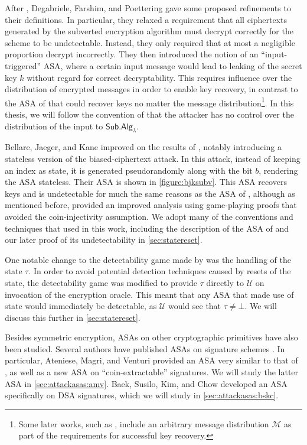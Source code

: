 After \cite{C:BelPatRog14}, Degabriele, Farshim, and Poettering \cite{FSE:DegFarPoe15} gave some proposed refinements to their definitions. In particular, they relaxed a requirement that all ciphertexts generated by the subverted encryption algorithm must decrypt correctly for the scheme to be undetectable. Instead, they only required that at most a negligible proportion decrypt incorrectly. They then introduced the notion of an ``input-triggered'' ASA, where a certain input message would lead to leaking of the secret key $k$ without regard for correct decryptability. This requires influence over the distribution of encrypted messages in order to enable key recovery, in contrast to the ASA of \cite{C:BelPatRog14} that could recover keys no matter the message distribution\footnote{Some later works, such as \cite{CCS:BelJaeKan15}, include an arbitrary message distribution $\mathcal{M}$ as part of the requirements for successful key recovery.}. In this thesis, we will follow the convention of \cite{C:BelPatRog14} that the attacker has no control over the distribution of the input to $\mathsf{Sub.Alg}_\lambda$.

Bellare, Jaeger, and Kane \cite{CCS:BelJaeKan15} improved on the results of \cite{C:BelPatRog14}, notably introducing a stateless version of the biased-ciphertext attack. In this attack, instead of keeping an index as state, it is generated pseudorandomly along with the bit $b$, rendering the ASA stateless. Their ASA is shown in \autoref{figure:bjksubv}. This ASA recovers keys and is undetectable for much the same reasons as the ASA of \cite{C:BelPatRog14}, although as mentioned before, \cite{CCS:BelJaeKan15} provided an improved analysis using game-playing proofs that avoided the coin-injectivity assumption. We adopt many of the conventions and techniques that \cite{CCS:BelJaeKan15} used in this work, including the description of the ASA of \cite{C:BelPatRog14} and our later proof of its undetectability in \autoref{sec:statereset}.

One notable change to the detectability game made by \cite{CCS:BelJaeKan15} was the handling of the state $\tau$. In order to avoid potential detection techniques caused by resets of the state, the detectability game was modified to provide $\tau$ directly to $\mathcal{U}$ on invocation of the encryption oracle. This meant that any ASA that made use of state would immediately be detectable, as $\mathcal{U}$ would see that $\tau \neq \bot$. We will discuss this further in \autoref{sec:statereset}.

Besides symmetric encryption, ASAs on other cryptographic primitives have also been studied. Several authors have published ASAs on signature schemes \cite{CCS:AteMagVen15,BSKC2019,ACISP:LCWW18}. In particular, Ateniese, Magri, and Venturi \cite{CCS:AteMagVen15} provided an ASA very similar to that of \cite{CCS:BelJaeKan15}, as well as a new ASA on ``coin-extractable'' signatures. We will study the latter ASA in \autoref{sec:attackasas:amv}. Baek, Susilo, Kim, and Chow \cite{BSKC2019} developed an ASA specifically on DSA signatures, which we will study in \autoref{sec:attackasas:bskc}.

